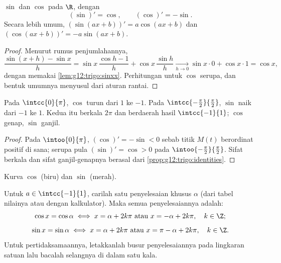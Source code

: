 \begin{theorem}\label{thm:g12:trigo:derivatives}
 $\sin$ dan $\cos$  pada $\R$, dengan
\[
(\sin)' = \cos, \qquad (\cos)' = -\sin .
\]
Secara lebih umum, $(\sin(ax+b))' = a\cos(ax+b)$ dan
$(\cos(ax+b))' = -a\sin(ax+b)$.
\end{theorem}

\begin{proof}
Menurut rumus penjumlahannya,
\[
\frac{\sin(x+h) - \sin x}{h}
= \sin x\,\frac{\cos h - 1}{h} + \cos x\,\frac{\sin h}{h}
\xrightarrow[h\to0]{} \sin x \cdot 0 + \cos x \cdot 1 = \cos x,
\]
dengan memakai \cref{lem:g12:trigo:sinxx}. Perhitungan untuk $\cos$ serupa,
dan bentuk umumnya menyusul dari aturan rantai.
\end{proof}

\begin{proposition}[Variasi]\label{prop:g12:trigo:variations}
Pada $\intcc{0}{\pi}$, $\cos$ turun dari $1$ ke $-1$. Pada
$\intcc{-\frac\pi2}{\frac\pi2}$, $\sin$ naik dari $-1$ ke $1$. Kedua 
itu berkala $2\pi$ dan berdaerah hasil $\intcc{-1}{1}$; $\cos$ genap,
$\sin$ ganjil.
\end{proposition}

\begin{proof}
Pada $\intoo{0}{\pi}$, $(\cos)' = -\sin < 0$ sebab titik $M(t)$ berordinat
positif di sana; serupa pula $(\sin)' = \cos > 0$ pada
$\intoo{-\frac\pi2}{\frac\pi2}$. Sifat berkala dan sifat ganjil-genapnya
berasal dari \cref{prop:g12:trigo:identities}.
\end{proof}

\begin{omfigure}

{\small Kurva $\cos$ (biru) dan $\sin$ (merah).}
\end{omfigure}

\begin{method}[Menyelesaikan $\cos x = a$ dan $\sin x = a$]\label{met:g12:trigo:equations}
Untuk $a \in \intcc{-1}{1}$, carilah satu penyelesaian khusus $\alpha$ (dari
tabel nilainya atau dengan kalkulator). Maka semua penyelesaiannya adalah:
\[
\cos x = \cos\alpha \iff x = \alpha + 2k\pi \text{ atau } x = -\alpha + 2k\pi,
\quad k \in \Z;
\]
\[
\sin x = \sin\alpha \iff x = \alpha + 2k\pi \text{ atau } x = \pi - \alpha + 2k\pi,
\quad k \in \Z.
\]
Untuk pertidaksamaannya, letakkanlah busur penyelesaiannya pada lingkaran
satuan lalu bacalah selangnya di dalam satu kala.
\end{method}

